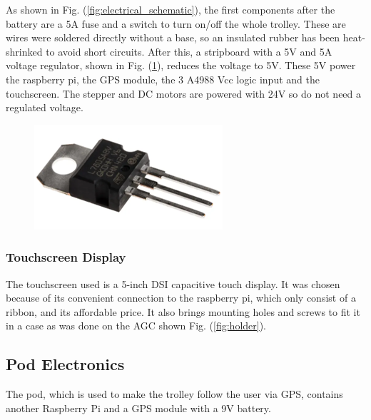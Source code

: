 \documentclass[11pt,landscape]{article}
\begin{document}
\begin{multicols}{3}
As shown in Fig. (\ref{fig:electrical_schematic}), the first components after
the battery are a 5A fuse and a switch to turn on/off the whole trolley. These
are wires were soldered directly without a base, so an insulated rubber has been
heat-shrinked to avoid short circuits. After this, a stripboard with a 5V and 5A
voltage regulator, shown in Fig. (\ref{fig:voltage_regulator}),
reduces the voltage to 5V. These 5V power the raspberry pi, the GPS module, the
3 A4988 Vcc logic input and the touchscreen. The stepper and DC motors are
powered with 24V so do not need a regulated voltage. 

\begin{figure}[H]
    \begin{center}
        \includegraphics[]{voltage_regulator}
        \label{fig:voltage_regulator}
        \end{center}
\end{figure}

\subsubsection{Touchscreen Display}
The touchscreen used is a 5-inch DSI capacitive touch display. It was chosen
because of its convenient connection to the raspberry pi, which only consist of
a ribbon, and its affordable price. It also brings mounting holes and screws to
fit it in a case as was done on the AGC shown Fig. (\ref{fig:holder}). 

\subsection{Pod Electronics}
The pod, which is used to make the trolley follow the user via GPS, contains
another Raspberry Pi and a GPS module with a 9V battery.

\end{multicols}
\end{document}
